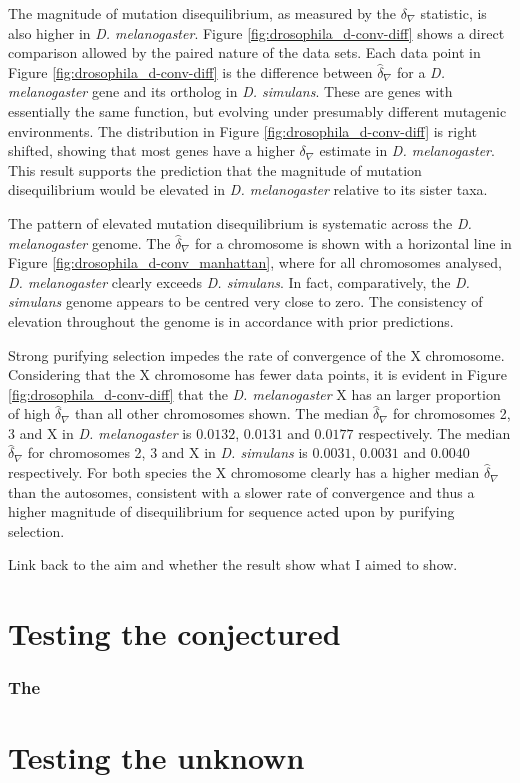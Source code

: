 The magnitude of mutation disequilibrium, as measured by the $\delta_\nabla$  statistic, is also higher in \textit{D. melanogaster}. Figure \ref{fig:drosophila_d-conv-diff} shows a direct comparison allowed by the paired nature of the data sets. Each data point in Figure \ref{fig:drosophila_d-conv-diff} is the difference between $\hat \delta_\nabla$ for a \textit{D. melanogaster} gene and its ortholog in \textit{D. simulans}. These are genes with essentially the same function, but evolving under presumably different mutagenic environments. The distribution in Figure \ref{fig:drosophila_d-conv-diff} is right shifted, showing that most genes have a higher $\delta_\nabla$ estimate in \textit{D. melanogaster}. This result supports the prediction that the magnitude of mutation disequilibrium would be elevated in \textit{D. melanogaster} relative to its sister taxa. 



The pattern of elevated mutation disequilibrium is systematic across the \textit{D. melanogaster} genome. The $\hat \delta_\nabla$ for a chromosome is shown with a horizontal line in Figure \ref{fig:drosophila_d-conv_manhattan}, where for all chromosomes analysed, \textit{D. melanogaster} clearly exceeds \textit{D. simulans}. In fact, comparatively, the \textit{D. simulans} genome appears to be centred very close to zero. The consistency of elevation throughout the genome is in accordance with prior predictions.

Strong purifying selection impedes the rate of convergence of the X chromosome. Considering that the X chromosome has fewer data points, it is evident in Figure \ref{fig:drosophila_d-conv-diff} that the \textit{D. melanogaster} X has an larger proportion of high $\hat \delta_\nabla$ than all other chromosomes shown. The median $\hat \delta_\nabla$ for chromosomes 2, 3 and X in \textit{D. melanogaster} is $0.0132$, $0.0131$ and $0.0177$ respectively. The median $\hat \delta_\nabla$ for chromosomes 2, 3 and X in \textit{D. simulans} is $0.0031$, $0.0031$ and $0.0040$ respectively. For both species the X chromosome clearly has a higher median $\hat \delta_\nabla$ than the autosomes, consistent with a slower rate of convergence and thus a higher magnitude of disequilibrium for sequence acted upon by purifying selection. 



Link back to the aim and whether the result show what I aimed to show. 


\section*{Testing the conjectured}





\subsubsection{The }



\section*{Testing the unknown}